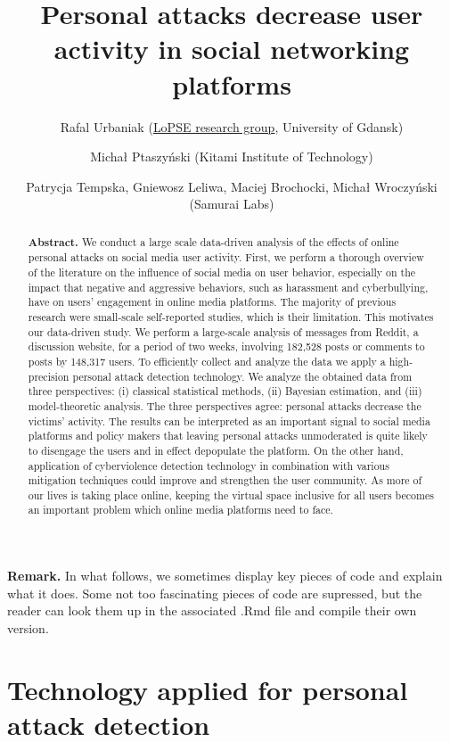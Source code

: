 \documentclass[10pt,]{scrartcl}
\title{Personal attacks decrease user activity in social networking platforms}
\author{\normalsize Rafal Urbaniak
(\href{http://lopsegdansk.blogspot.com/p/lopse-team.html}{LoPSE research
group}, University of Gdansk) \and \normalsize Michał Ptaszyński (Kitami Institute of Technology) \and \normalsize Patrycja Tempska, Gniewosz Leliwa, Maciej Brochocki, Michał
Wroczyński (Samurai Labs)}
\date{}
\begin{document}
\maketitle

\vspace{-2mm}

\begin{abstract}
\noindent \textbf{Abstract.} 
We conduct a large scale data-driven analysis of the effects of online personal attacks on social media user activity. First, we perform a thorough overview of the literature on the influence of social media on user behavior, especially on the impact that negative and aggressive behaviors, such as harassment and cyberbullying, have on users’ engagement in online media platforms. The majority of previous research were  small-scale self-reported studies, which is their limitation. This motivates our data-driven study. We perform a large-scale analysis of messages from Reddit, a discussion website, for a period of two weeks, involving 182,528 posts or comments to posts by 148,317 users. To efficiently collect and analyze the data we apply a high-precision personal attack detection technology. We analyze the obtained data from three perspectives: (i) classical statistical methods, (ii) Bayesian estimation, and (iii) model-theoretic analysis. The three perspectives agree: personal attacks decrease the victims’ activity.
The results can be interpreted as an important signal to social media platforms and policy makers that leaving personal attacks unmoderated is quite likely to disengage the users and in effect depopulate the platform. On the other hand, application of cyberviolence detection technology in combination with various mitigation techniques could improve and strengthen the user community. As more of our lives is taking place online, keeping the virtual space inclusive for all users becomes an important problem which online media platforms need to face.
\end{abstract}

\vspace{2cm}

\textbf{Remark.} In what follows, we sometimes display key pieces of
code and explain what it does. Some not too fascinating pieces of code
are supressed, but the reader can look them up in the associated .Rmd
file and compile their own version.

\section{Technology applied for personal attack detection}
\label{technology}
\end{document}
